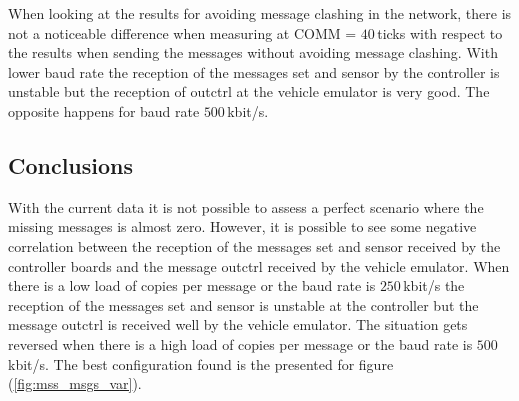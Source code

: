 \documentclass[table,xcdraw]{article}
\begin{document}
When looking at the results for avoiding message clashing in the network, there is not a noticeable difference when measuring at COMM = $40\,$ticks with respect to the results when sending the messages without avoiding message clashing. With lower baud rate the reception of the messages set and sensor by the controller is unstable but the reception of outctrl at the vehicle emulator is very good. The opposite happens for baud rate $500\,$kbit/s.

\subsection{Conclusions}
With the current data it is not possible to assess a perfect scenario where the missing messages is almost zero. However, it is possible to see some negative correlation between the reception of the messages set and sensor received by the controller boards and the message outctrl received by the vehicle emulator. When there is a low load of copies per message or the baud rate is $250\,$kbit/s the reception of the messages set and sensor is unstable at the controller but the message outctrl is received well by the vehicle emulator. The situation gets reversed when there is a high load of copies per message or the baud rate is $500\,$kbit/s. The best configuration found is the presented for figure (\ref{fig:mss_msgs_var}).
\end{document}
